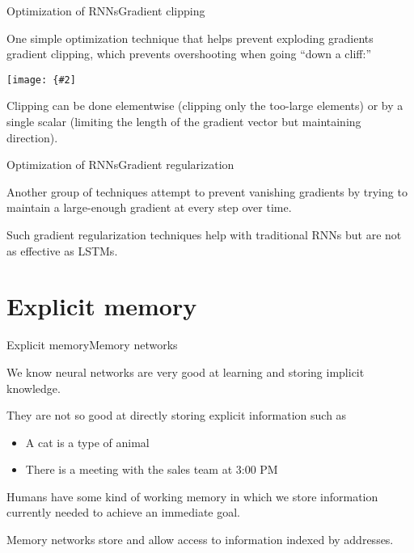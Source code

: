 \documentclass{beamer}
\newcommand{\myfig}[3]{\centerline{\texttt{[image: \{\#2]}}}
    \centerline{\scriptsize #3}}
\begin{document}
\begin{frame}{Optimization of RNNs}{Gradient clipping}

  One simple optimization technique that helps prevent exploding
  gradients \alert{gradient clipping}, which prevents overshooting
  when going ``down a cliff:''

  \medskip

  \myfig{3in}{goodfellow-fig10-17}{Goodfellow, Bengio, and Courville (2016), Fig.\ 10.17}

  \medskip
  
  Clipping can be done \alert{elementwise} (clipping only the
  too-large elements) or by a \alert{single scalar} (limiting the
  length of the gradient vector but maintaining direction).
  
\end{frame}


\begin{frame}{Optimization of RNNs}{Gradient regularization}

  Another group of techniques attempt to prevent vanishing gradients
  by trying to maintain a large-enough gradient at every step over time.

  \medskip

  Such \alert{gradient regularization} techniques help with traditional RNNs
  but are not as effective as LSTMs.
  
\end{frame}

\section{Explicit memory}

\begin{frame}{Explicit memory}{Memory networks}

  We know neural networks are very good at learning and storing
  \alert{implicit knowledge}.

  \medskip

  They are not so good at \alert{directly storing explicit information}
  such as
  \begin{itemize}
  \item A cat is a type of animal
  \item There is a meeting with the sales team at 3:00 PM
  \end{itemize}

  \medskip

  Humans have some kind of \alert{working memory} in which we store
  information currently needed to achieve an immediate goal.

  \medskip

  \alert{Memory networks} store and allow access to information
  indexed by addresses.

\end{frame}
\end{document}

